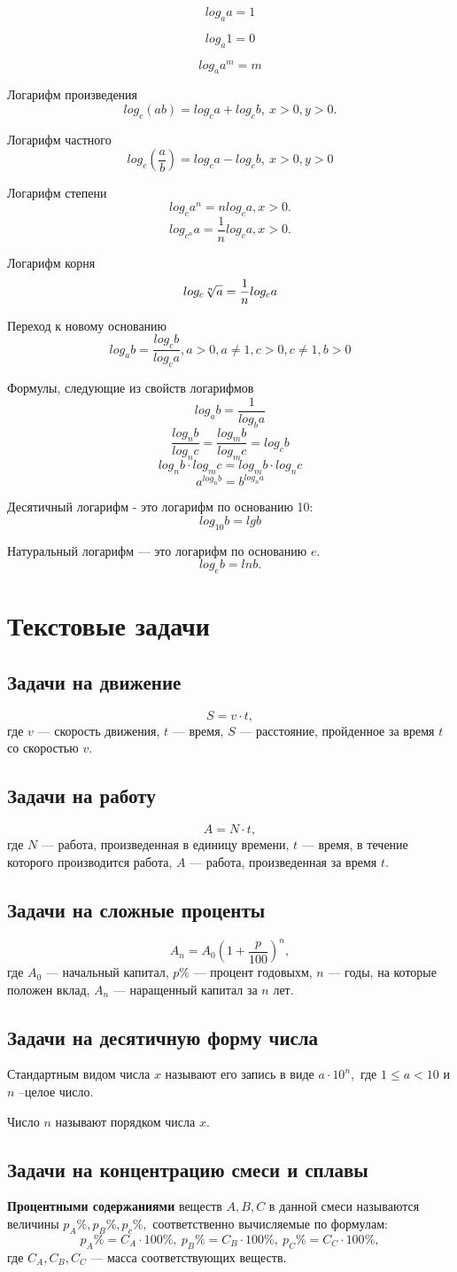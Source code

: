 \documentclass[a4paper, 12pt]{article}
\begin{document}
$$log_aa=1$$

$$log_a1=0$$

$$log_aa^m=m$$

Логарифм произведения
$$log_c(ab)=log_ca+log_cb, \ x>0, y>0.$$

Логарифм частного
$$log_c(\frac{a}{b})=log_ca-log_cb, \ x>0, y>0$$

Логарифм степени
$$log_ca^n=nlog_ca, x>0.$$
$$log_{c^n}a=\frac{1}{n}log_ca, x>0.$$

Логарифм корня
$$log_c \root{n}\of{a}=\frac{1}{n}log_ca$$

Переход к новому основанию
$$log_ab=\frac{log_cb}{log_ca}, a>0, a\not=1, c>0, c\not=1, b>0$$

Формулы, следующие из свойств логарифмов
$$log_ab=\frac{1}{log_ba}$$
$$\frac{log_nb}{log_nc}=\frac{log_mb}{log_mc}=log_cb$$
$$log_nb\cdot log_mc=log_mb\cdot log_nc$$
$$a^{log_nb}=b^{log_na}$$

Десятичный логарифм - это логарифм по основанию 10:
$$log_{10}b=lgb$$

Натуральный логарифм --- это логарифм по основанию $e.$
$$log_eb=ln b.$$

\section{Текстовые задачи}
\subsection{Задачи на движение}
$$S=v\cdot t,$$
где $v$ --- скорость движения, $t$ --- время, $S$ --- расстояние, пройденное за время $t$ со скоростью $v.$
\subsection{Задачи на работу}
$$A=N\cdot t,$$
где $N$ --- работа, произведенная в единицу времени, $t$ --- время, в течение которого производится работа, $A$ --- работа, произведенная за время $t.$
\subsection{Задачи на сложные проценты}
$$A_n=A_0\left( 1+\frac{p}{100}\right)^n ,$$
где $A_0$ --- начальный капитал, $p\%$ --- процент годовыхм, $n$ --- годы, на которые положен вклад, $A_n$ --- наращенный капитал за $n$ лет. 
\subsection{Задачи на десятичную форму числа}
Стандартным видом числа $x$ называют его запись в виде $a\cdot 10^n,$ где $1\le a < 10$ и $n$ --целое число.

Число $n$ называют порядком числа $x.$ 

\subsection{Задачи на концентрацию смеси и сплавы}
\textbf{Процентными содержаниями} веществ $A, B, C$ в данной смеси называются величины $p_A\%, p_B\%, p_c\%,$ соответственно вычисляемые по формулам:
$$
p_A\%=C_A\cdot 100\%,\  p_B\%=C_B\cdot 100\%,\ p_C\%=C_C\cdot 100\%,
$$
где $C_A, C_B, C_C$ --- масса соответствующих веществ.
\end{document}

